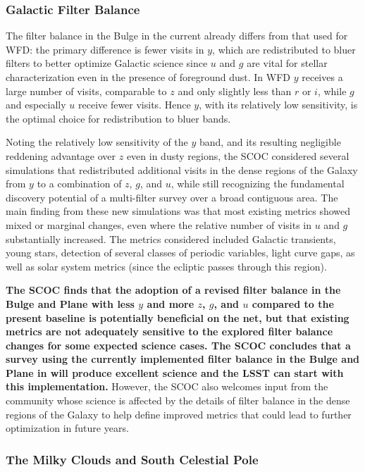 \subsubsection{Galactic Filter Balance}\label{sec:subG:filterbalance}

The filter balance in the Bulge in the current  already differs from that used for WFD: the primary difference is fewer visits in $y$, which are redistributed to bluer filters to better optimize Galactic science since $u$ and $g$ are vital for stellar characterization even in the presence of foreground dust. In WFD $y$ receives a large number of visits, comparable to $z$ and only slightly less than $r$ or $i$, while $g$ and especially $u$ receive fewer visits. Hence $y$, with its relatively low sensitivity, is the optimal choice for redistribution to bluer bands.

Noting the relatively low sensitivity of the $y$ band, and its resulting negligible reddening advantage over $z$ even in dusty regions, the SCOC considered several simulations that redistributed additional visits in the dense regions of the Galaxy from $y$ to a combination of $z$, $g$, and $u$, while still recognizing the fundamental discovery potential of a multi-filter survey over a broad contiguous area. The main finding from these new simulations was that most existing metrics showed mixed or marginal changes, even where the relative number of visits in $u$ and $g$ substantially increased. The metrics considered included Galactic transients, young stars, detection of several classes of periodic variables, light curve gaps, as well as solar system metrics (since the ecliptic passes through this region).

{\bf The SCOC finds that the adoption of a revised filter balance in the Bulge and Plane with less $y$ and more $z$, $g$, and $u$ compared to the present baseline is potentially beneficial on the net, but that existing metrics are not adequately sensitive to the explored filter balance changes for some expected science cases. The SCOC concludes that a survey using the currently implemented filter balance in the Bulge and Plane in  will produce excellent science and the LSST can start with this implementation.} 
However, the SCOC also welcomes input from the community whose science is affected by the details of filter balance in the dense regions of the Galaxy to help define improved metrics that could lead to further optimization in future years.


\subsubsection{The Milky Clouds and South Celestial Pole}\label{sec:subG:specialregions}

